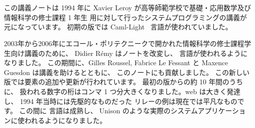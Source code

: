 %
%

\chapter*{\label{sec/intro}}
\enlargethispage{2\baselineskip} %

この講義ノートは 1994 年に Xavier Leroy が高等師範学校で基礎・応用数学及び情報科学の修士課程 1 年生
用に対して行ったシステムプログラミングの講義が元になっています。
初期の版では Caml-Light~\cite{Caml-Light} 言語が使われていました。

%
2003年から2006年にエコール・ポリテクニークで開かれた情報科学の修士課程学生向け講義のために、
Didier R\'emy はノートを改変し、 \ocaml \cite{OCaml} 言語が使われるようになりました。
この期間に、Gilles Roussel, Fabrice Le Fessant と Maxence Guesdon は講義を助けるとともに、
このノートにも貢献しました。
この新しい版では要素の追加や更新が行われています。
最初の版からの約 10 年間のうちに、 扱われる数字の桁はコンマ 1 つ分大きくなりました。web は大きく発達し、
1994 年当時には先駆的なものだった \http リレーの例は現在では平凡なものです。
この間に \ocaml 言語は成熟し、 Unison \cite{Unison} のような実際のシステムアプリケーションに使われるようになりました。

